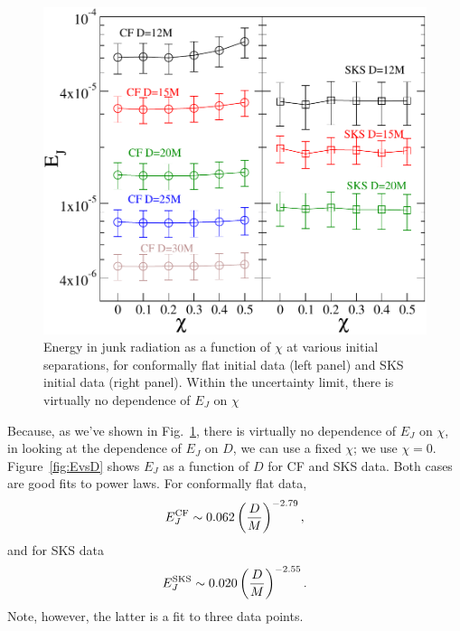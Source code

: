 \begin{figure}
\includegraphics[width=0.95\columnwidth]{chap5/EvsS}
  \caption{Energy in junk radiation as a function of $\chi$ at various
  initial separations, for conformally flat initial data (left panel)
  and SKS initial data (right panel). Within the uncertainty limit,
  there is virtually no dependence of $E_J$ on $\chi$ }
  \label{fig:EvsS}
\end{figure}

Because, as we've shown in Fig.~\ref{fig:EvsS}, there is virtually
no dependence of $E_J$ on $\chi$, in looking at the dependence of
$E_J$ on $D$, we can use a fixed $\chi$; we use
$\chi=0$. Figure~\ref{fig:EvsD} shows $E_J$ as a function of $D$ for
CF and SKS data. Both cases are good fits to power laws. For
conformally flat data,
\begin{equation}
E_J^{\rm CF}\sim0.062\left(\frac{D}{M}\right)^{-2.79},
\end{equation}
and for SKS data
\begin{equation}
E_J^{\rm SKS}\sim 0.020\left(\frac{D}{M}\right)^{-2.55}.
\end{equation}
Note, however, the latter is a fit to three data points.




